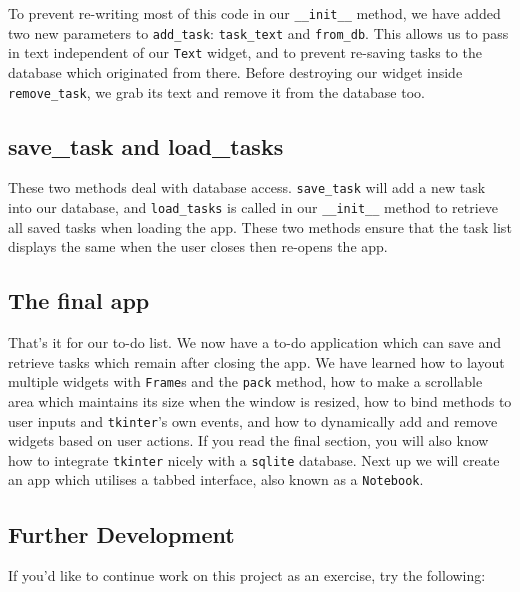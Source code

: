 \documentclass[a4paper,11pt,openany]{book}
\begin{document}
To prevent re-writing most of this code in our \lstinline[columns=fixed]{__init__} method, we have added two new parameters to \lstinline[columns=fixed]{add_task}: \lstinline[columns=fixed]{task_text} and \lstinline[columns=fixed]{from_db}. This allows us to pass in text independent of our \lstinline[columns=fixed]{Text} widget, and to prevent re-saving tasks to the database which originated from there. Before destroying our widget inside \lstinline[columns=fixed]{remove_task}, we grab its text and remove it from the database too. 

\subsection{save\_task and load\_tasks}
These two methods deal with database access. \lstinline[columns=fixed]{save_task} will add a new task into our database, and \lstinline[columns=fixed]{load_tasks} is called in our \lstinline[columns=fixed]{__init__} method to retrieve all saved tasks when loading the app. These two methods ensure that the task list displays the same when the user closes then re-opens the app.

\subsection{The final app}

That's it for our to-do list. We now have a to-do application which can save and retrieve tasks which remain after closing the app. We have learned how to layout multiple widgets with \lstinline[columns=fixed]{Frame}s and the \lstinline[columns=fixed]{pack} method, how to make a scrollable area which maintains its size when the window is resized, how to bind methods to user inputs and \lstinline[columns=fixed]{tkinter}'s own events, and how to dynamically add and remove widgets based on user actions. If you read the final section, you will also know how to integrate \lstinline[columns=fixed]{tkinter} nicely with a \lstinline[columns=fixed]{sqlite} database. Next up we will create an app which utilises a tabbed interface, also known as a \lstinline[columns=fixed]{Notebook}.

\subsection{Further Development}

If you'd like to continue work on this project as an exercise, try the following:
\end{document}

